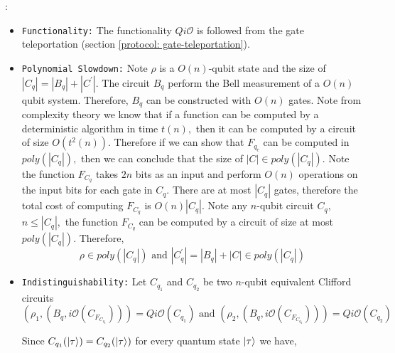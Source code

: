 
:
\begin{itemize}
\item  {\tt Functionality:} The functionality $Qi\mathcal{O}$ is followed from the gate teleportation (section \ref{protocol: gate-teleportation}).
\item {\tt Polynomial Slowdown:} Note $\rho$ is a $O(n)$-qubit state  and the size of $|C_q|=|B_q|+|C^\prime|.$ The circuit $B_q$ perform the Bell measurement of a $O(n)$ qubit system. Therefore, $B_q$ can be constructed with $O(n)$ gates. Note from complexity theory we know that if a function can be computed by a deterministic algorithm in time $t(n),$ then it can be computed by a circuit of size $O(t^2(n)).$ Therefore if we can show  that  ${F_{q_c}}$ can be computed in $poly(|C_q|),$ then we can conclude that the size of $|C|\in poly(|C_q|).$ Note the function $F_{C_q}$ takes  $2n$ bits as an input and perform $O(n)$ operations on the input bits for each gate in $C_{q}.$ There are at most $|C_q|$ gates, therefore the total cost of computing $F_{C_q}$ is $O(n)|C_q|.$  Note any $n$-qubit circuit $C_q,$ $n\leq |C_q|,$ the function $F_{C_q}$ can be computed by a circuit  of size at most $poly(|C_{q}|).$ Therefore,
\begin{equation*}
\rho\in poly(|C_q|)    \mbox{ and } |C_q^\prime |=|B_q|+|C| \in poly(|C_q|)
\end{equation*}

\item  {\tt Indistinguishability:} Let $C_{q_1}$ and $C_{q_2}$ be two $n$-qubit equivalent Clifford circuits
\begin{equation*}
\left(\rho_1 ,\left(B_q, i\mathcal{O}(C_{F_{C_{q_1}}})\right)\right)= Qi\mathcal{O}(C_{q_1}) \mbox{ and } \left(\rho_2 ,\left(B_q, i\mathcal{O}(C_{F_{C_{q_2}}})\right)\right)= Qi\mathcal{O}(C_{q_2})
\end{equation*}

Since $C_{q_1}({\lvert}\tau\rangle)=C_{q_2}({\lvert}\tau\rangle)$ for every quantum state ${\lvert}\tau\rangle$ we have,


\end{itemize}
